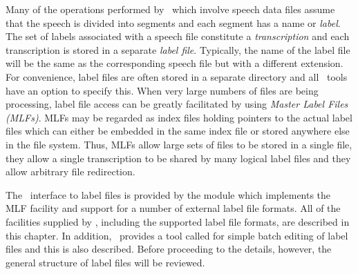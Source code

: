 %
%


Many of the operations performed by \HTK\ which involve speech data
files assume that the speech is divided into segments and each segment
has a name or \textit{label}.  The set of labels associated with a
speech file constitute a \textit{transcription} and each transcription is
stored in a separate \textit{label file}.  Typically, the name of the
label file will be the same as the corresponding speech file but with
a different extension.  For convenience, label files are often stored
in a separate directory and all \HTK\ tools have an option to specify
this.  When very large numbers of files are being processing, label
file access can be greatly facilitated by using
\textit{Master Label Files (MLFs)}.  MLFs may be regarded as index
files holding pointers to the actual label files which can either be
embedded in the same index file or stored anywhere else in the file system.
Thus, MLFs allow large sets of files to be stored in a single file, they
allow a single transcription to be shared by many logical label files
and they allow arbitrary file redirection.

The \HTK\ interface to label files is provided by the module 
which implements the MLF facility and support for a number of external
label file formats. 
All of the facilities supplied by , including the
supported label file formats, are described in this chapter.
In addition, \HTK\ provides a tool called  for simple 
batch editing of label files and this is also described.
Before proceeding to the details, however, the general structure of
label files will be reviewed.

